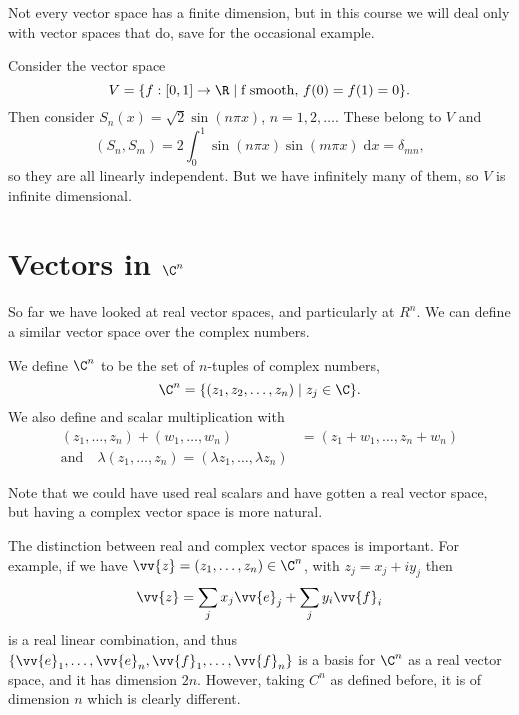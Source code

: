 Not every vector space has a finite dimension, but in this course we will deal only with vector spaces that do, save for the occasional example.

\begin{example}
    Consider the vector space
    $$
    V = \{ f : [0, 1] \rightarrow \R \mid \text{f smooth, } f(0) = f(1) = 0 \}. 
    $$
    Then consider $S_n(x) = \sqrt{2} \sin(n \pi x)$, $n = 1, 2, \dots$. These belong to $V$ and
    $$
    (S_n, S_m) = 2 \int_{0}^1 \sin (n \pi x) \sin (m \pi x) \; \mathrm{d}x = \delta_{mn},
    $$
    so they are all linearly independent. But we have infinitely many of them, so $V$ is infinite dimensional.
\end{example}

\section{Vectors in $\C^n$}

So far we have looked at real vector spaces, and particularly at $R^n$. We can define a similar vector space over the complex numbers.

\begin{definition}[$\C^n$ Space]
    We define $\C^n$ to be the set of $n$-tuples of complex numbers,
    $$
    \C^n = \{(z_1, z_2, \dots, z_n) \mid z_j \in \C\}.
    $$
    We also define  and scalar multiplication with
    \begin{align*}
        \left(z_{1}, \ldots, z_{n}\right)+\left(w_{1}, \ldots, w_{n}\right)&=\left(z_{1}+w_{1}, \ldots, z_{n}+w_{n}\right) \\
        \text{and} \quad \lambda\left(z_{1}, \ldots, z_{n}\right)=\left(\lambda z_{1}, \ldots, \lambda z_{n}\right) 
    \end{align*}
\end{definition}

Note that we could have used real scalars and have gotten a real vector space, but having a complex vector space is more natural. 

The distinction between real and complex vector spaces is important. For example, if we have $\vv{z} = (z_1, \dots, z_n) \in \C^n$, with $z_j = x_j + i y_j$ then
$$
\vv{z} = \sum_j x_j \vv{e}_j + \sum_j y_i \vv{f}_i
$$
is a real linear combination, and thus $\{\vv{e}_1, \dots, \vv{e}_n, \vv{f}_1, \dots, \vv{f}_n\}$ is a basis for $\C^n$ as a real vector space, and it has dimension $2n$. However, taking $C^n$ as defined before, it is of dimension $n$ which is clearly different.

